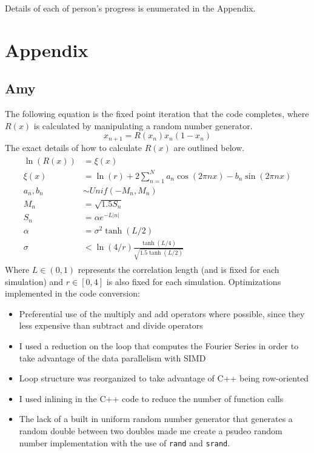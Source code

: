 \documentclass[12pt]{article}
\newcommand{\bi}{\begin{itemize}}
\newcommand{\ei}{\end{itemize}}
\begin{document}
Details of each of person's progress is enumerated in the Appendix.

\section{Appendix}
\subsection{Amy}
The following equation is the fixed point iteration that the code
completes, where $R(x)$ is calculated by manipulating a random number generator.
\begin{equation}\label{randmap}
x_{n+1} = R(x_n)x_n(1-x_n)
\end{equation}
The exact details of how to calculate $R(x)$ are outlined below.
\begin{align*}
\begin{split}
\ln(R(x)) &= \xi(x)\\
\xi(x) &= \ln(r) + 2\sum^N_{n=1}a_n\cos(2\pi nx)-b_n\sin(2\pi nx)\\
a_n,b_n &\sim Unif(-M_n,M_n)\\
M_n &= \sqrt{1.5S_n}\\
S_n &= \alpha e^{-L|n|}\\
\alpha &= \sigma^2 \tanh(L/2)\\
\sigma &< \ln(4/r)\frac{\tanh(L/4)}{\sqrt{1.5\tanh(L/2)}}
\end{split}
\end{align*}
Where $L \in (0,1)$ represents the correlation length (and is fixed
for each simulation) and $r \in [0,4]$ is also fixed for each
simulation. Optimizations implemented in the code conversion:
\bi
\item Preferential use of the  multiply and add operators where possible, since
they less expensive than subtract and divide operators
\item I used a reduction on the loop that computes the Fourier Series
  in order to take advantage of the data parallelism with SIMD
\item Loop structure was reorganized to take advantage of C++ being row-oriented
\item I used inlining in the C++ code to reduce the number of function calls
\item The lack of a built in uniform random number generator that generates a random
double between two doubles made me create a psudeo random number
implementation with the use of \texttt{rand} and \texttt{srand}.

\ei
\end{document}
